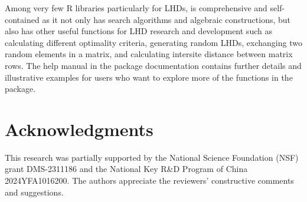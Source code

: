 Among very few R libraries particularly for LHDs,  is comprehensive and self-contained as it not only has search algorithms and algebraic constructions, but also has other useful functions for LHD research and development such as calculating different optimality criteria, generating random LHDs, exchanging two random elements in a matrix, and calculating intersite distance between matrix rows. The help manual in the package documentation contains further details and illustrative examples for users who want to explore more of the functions in the package.

\section*{Acknowledgments}

This research was partially supported by the National Science Foundation (NSF) grant DMS-2311186 and the National Key R\&D Program of China 2024YFA1016200. The authors appreciate the reviewers' constructive comments and suggestions.



\address{Hongzhi Wang\\
  }

\address{Qian Xiao\\
  Department of Statistics, School of Mathematical Sciences, Shanghai Jiao Tong University\\
  800 Dongchuan Road, Minhang, Shanghai, 200240\\
  China\\
  }

\address{Abhyuday Mandal\\
  Department of Statistics, University of Georgia\\
  310 Herty Drive, Athens, GA 30602\\
  USA\\
  }
